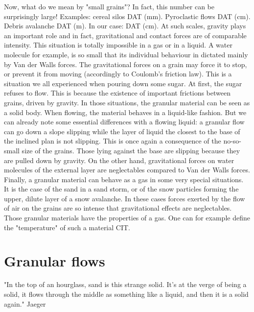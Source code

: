 \documentclass[11pt,a4paper]{report}
\begin{document}
Now, what do we mean by "small grains"?
In fact, this number can be surprisingly large!
Examples: cereal silos DAT (mm). Pyroclastic flows DAT (cm). Debris avalanche DAT (m). 
In our case: DAT (cm).
At such scales, gravity plays an important role and in fact, gravitational and contact forces are of comparable intensity. This situation is totally impossible in a gas or in a liquid. A water molecule for example, is so small that its individual behaviour in dictated mainly by Van der Walls forces.
The gravitational forces on a grain may force it to stop, or prevent it from moving (accordingly to Coulomb's friction law).
This is a situation we all experienced when pouring down some sugar. At first, the sugar refuses to flow. This is because the existence of important frictions between grains, driven by gravity. 
In those situations, the granular material can be seen as a solid body.
When flowing, the material behaves in a liquid-like fashion. But we can already note some essential differences with a flowing  liquid: a granular flow can go down a slope slipping while the layer of liquid the closest to the base of the inclined plan is not slipping. This is once again a consequence of the no-so-small size of the grains. Those lying against the base are slipping because they are pulled down by gravity. 
On the other hand, gravitational forces on water molecules of the external layer are neglectables compared to Van der Walls forces. 
Finally, a granular material can behave as a gas in some very special situations. It is the case of the sand in a sand storm, or of the snow particles forming the upper, dilute layer of a snow avalanche. In these cases forces exerted by the flow of air on the grains are so intense that gravitational effects are neglectables. 
Those granular materials have the properties of a gas. One can for example define the "temperature" of such a material CIT.

\section{Granular flows}

"In the top of an hourglass, sand is this strange solid. It's at the verge of being a solid, it flows through the middle as something like a liquid, and then it is a solid again." Jaeger
\end{document}
